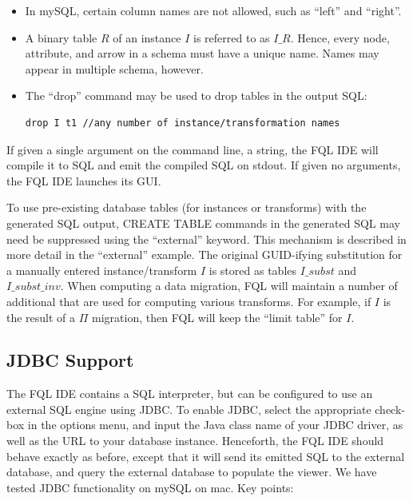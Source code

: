 \documentclass[12pt]{article}
\begin{document}
\begin{itemize}

\item In mySQL, certain column names are not allowed, such as ``left'' and ``right''.

\item A binary table $R$ of an instance $I$ is referred to as $I\_R$.  Hence, every node, attribute, and arrow in a schema must have a unique name.  Names may appear in multiple schema, however.


\item The ``drop'' command may be used to drop tables in the output SQL:
\begin{verbatim}
drop I t1 //any number of instance/transformation names
\end{verbatim}

\end{itemize}

If given a single argument on the command line, a string, the FQL IDE will compile it to SQL and emit the compiled SQL on stdout.  If given no arguments, the FQL IDE launches its GUI.  

To use pre-existing database tables (for instances or transforms) with the generated SQL output, CREATE TABLE commands in the generated SQL may need be suppressed using the ``external'' keyword.  This mechanism is described in more detail in the ``external'' example.  The original GUID-ifying substitution for a manually entered instance/transform $I$ is stored as tables $I\_subst$ and $I\_subst\_inv$.  When computing a data migration, FQL will maintain a number of additional that are used for computing various transforms.  For example, if $I$ is the result of a $\Pi$ migration, then FQL will keep the ``limit table'' for $I$.

\subsection{JDBC Support}

The FQL IDE contains a SQL interpreter, but can be configured to use an external SQL engine using JDBC.  To enable JDBC, select the appropriate check-box in the options menu, and input the Java class name of your JDBC driver, as well as the URL to your database instance.  Henceforth, the FQL IDE should behave exactly as before, except that it will send its emitted SQL to the external database, and query the external database to populate the viewer.  We have tested JDBC functionality on mySQL on mac.  Key points:
\end{document}
